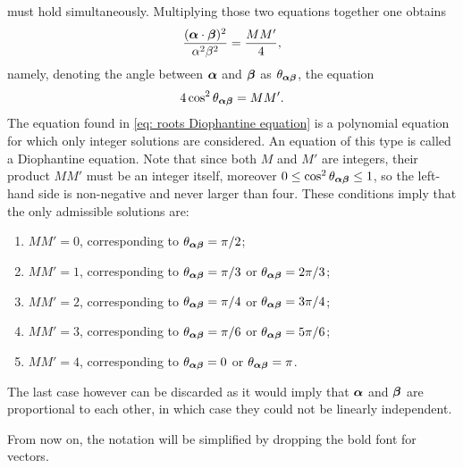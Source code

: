 must hold simultaneously. Multiplying those two equations together one obtains
\begin{equation}
    \frac{(\bm{\alpha} \cdot \bm{\beta})^2}{\alpha^2\beta^2} = \frac{MM'}{4},
\end{equation}
namely, denoting the angle between $\bm{\alpha}$ and $\bm{\beta}$ as $\theta_{\bm{\alpha}\bm{\beta}}$, the equation
\begin{equation}
\label{eq: roots Diophantine equation}
    4\cos^2{\theta_{\bm{\alpha}\bm{\beta}}} = MM'.
\end{equation}
The equation found in \eqref{eq: roots Diophantine equation} is a polynomial equation for which only integer solutions are considered. An equation of this type is called a Diophantine equation. Note that since both $M$ and $M'$ are integers, their product $MM'$ must be an integer itself, moreover $0 \le \cos^2{\theta_{\bm{\alpha}\bm{\beta}}} \le 1$, so the left-hand side is non-negative and never larger than four. These conditions imply that the only admissible solutions are:
\begin{enumerate}
    \item $MM' = 0$, corresponding to $\theta_{\bm{\alpha}\bm{\beta}} = \pi/2$;
    \item $MM' = 1$, corresponding to $\theta_{\bm{\alpha}\bm{\beta}} = \pi/3$ or $\theta_{\bm{\alpha}\bm{\beta}} = 2\pi/3$;
    \item $MM' = 2$, corresponding to $\theta_{\bm{\alpha}\bm{\beta}} = \pi/4$ or $\theta_{\bm{\alpha}\bm{\beta}} = 3\pi/4$;
    \item $MM' = 3$, corresponding to $\theta_{\bm{\alpha}\bm{\beta}} = \pi/6$ or $\theta_{\bm{\alpha}\bm{\beta}} = 5\pi/6$;
    \item $MM' = 4$, corresponding to $\theta_{\bm{\alpha}\bm{\beta}} = 0$ or $\theta_{\bm{\alpha}\bm{\beta}} = \pi$.
\end{enumerate}
The last case however can be discarded as it would imply that $\bm{\alpha}$ and $\bm{\beta}$ are proportional to each other, in which case they could not be linearly independent. 
\begin{notz}
    From now on, the notation will be simplified by dropping the bold font for vectors.
\end{notz}

